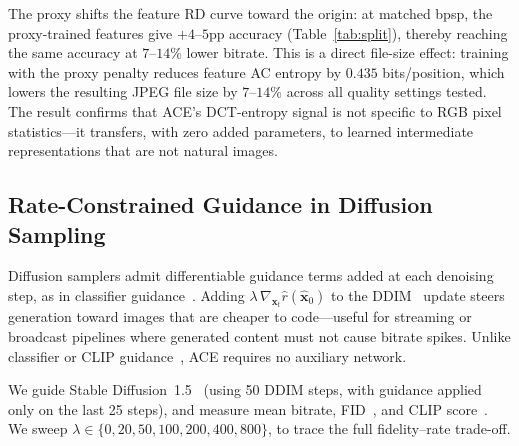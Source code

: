 \documentclass{article}
\theoremstyle{definition}
\newcommand{\bx}{\boldsymbol{x}}
\begin{document}
The proxy shifts the feature RD curve toward the origin: at matched bpsp, the proxy-trained features give $+4$--$5$pp accuracy (Table~\ref{tab:split}), thereby reaching the same accuracy at $7$--$14\%$ lower bitrate.
This is a direct file-size effect: training with the proxy penalty reduces feature AC entropy by $0.435$ bits/position, which lowers the resulting JPEG file size by $7$--$14\%$ across all quality settings tested.
The result confirms that ACE's DCT-entropy signal is not specific to RGB pixel statistics---it transfers, with zero added parameters, to learned intermediate representations that are not natural images.

\subsection{Rate-Constrained Guidance in Diffusion Sampling}
\label{sec:diffguide}

Diffusion samplers admit differentiable guidance terms added at each denoising step, as in classifier guidance~\citep{dhariwal2021diffusion}.
Adding $\lambda\,\nabla_{\bx_t}\hat{r}(\hat{\bx}_0)$ to the DDIM~\citep{song2021ddim} update steers generation toward images that are cheaper to code---useful for streaming or broadcast pipelines where generated content must not cause bitrate spikes.
Unlike classifier or CLIP guidance~\citep{mishra2024image}, ACE requires no auxiliary network.

We guide Stable Diffusion~1.5~\citep{rombach2022latent} (using 50 DDIM steps, with guidance applied only on the last 25 steps), and measure mean bitrate, FID~\citep{heusel2017fid}, and CLIP score~\citep{hessel2021clipscore}.
We sweep $\lambda\in\{0,20,50,100,200,400,800\}$, to trace the full fidelity--rate trade-off.
\end{document}
